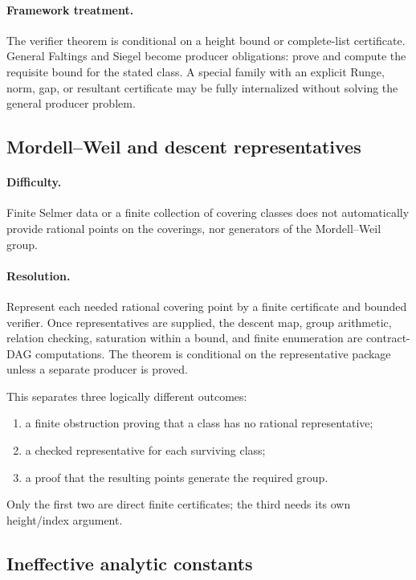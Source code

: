 \paragraph{Framework treatment.}
The verifier theorem is conditional on a height bound or complete-list certificate.  General Faltings and Siegel become producer obligations: prove and compute the requisite bound for the stated class.  A special family with an explicit Runge, norm, gap, or resultant certificate may be fully internalized without solving the general producer problem.

\subsection{Mordell--Weil and descent representatives}

\paragraph{Difficulty.}
Finite Selmer data or a finite collection of covering classes does not automatically provide rational points on the coverings, nor generators of the Mordell--Weil group.

\paragraph{Resolution.}
Represent each needed rational covering point by a finite certificate and bounded verifier.  Once representatives are supplied, the descent map, group arithmetic, relation checking, saturation within a bound, and finite enumeration are contract-DAG computations.  The theorem is conditional on the representative package unless a separate producer is proved.

This separates three logically different outcomes:

\begin{enumerate}
  \item a finite obstruction proving that a class has no rational representative;
  \item a checked representative for each surviving class;
  \item a proof that the resulting points generate the required group.
\end{enumerate}

Only the first two are direct finite certificates; the third needs its own height/index argument.

\subsection{Ineffective analytic constants}

